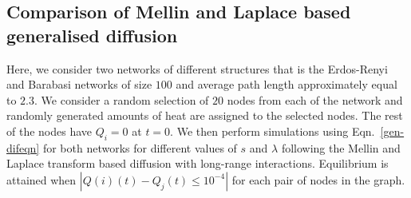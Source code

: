 \documentclass[10pt,a4paper]{article}
\theoremstyle{plain}
\theoremstyle{definition}
\begin{document}
        \subsection{Comparison of Mellin and Laplace based generalised diffusion}
        Here, we consider two networks of different structures that is the Erdos-Renyi\citep{erdos1959random,karonski1982review,newman2002random} and Barabasi networks \citep{barabasi1999emergence,newman2002random} of size $100$ and average path length approximately equal to $2.3$. We consider a random selection of $20$ nodes from each of the network and randomly generated amounts of heat are assigned to the selected nodes. The rest of the nodes have $Q_i = 0$ at $t=0$. We then perform simulations using Eqn.~\ref{gen-difeqn} for both networks for different values of $s$ and $\lambda$ following the Mellin and Laplace transform based diffusion with long-range interactions. Equilibrium is attained when $|Q(i)(t) -Q_j(t) \leq 10^{-4}|$ for each pair of nodes in the graph.
        	
\end{document}
